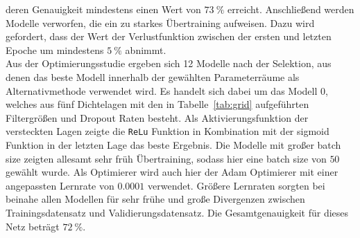 deren Genauigkeit mindestens einen Wert von $\SI{73}{\percent}$ erreicht.
Anschließend werden Modelle verworfen, die ein zu starkes Übertraining
aufweisen. Dazu wird gefordert, dass der Wert der Verlustfunktion zwischen der
ersten und letzten Epoche um mindestens $\SI{5}{\percent}$ abnimmt.\\
Aus der Optimierungsstudie ergeben sich 12 Modelle nach der Selektion, aus
denen das beste Modell innerhalb der gewählten Parameterräume als
Alternativmethode verwendet wird. Es handelt sich dabei um das Modell 0,
welches aus fünf Dichtelagen mit den in Tabelle~\ref{tab:grid} aufgeführten
Filtergrößen und Dropout Raten besteht. Als Aktivierungsfunktion der
versteckten Lagen zeigte die \texttt{ReLu} Funktion in Kombination mit der
sigmoid Funktion in der letzten Lage das beste Ergebnis. Die Modelle mit großer
batch size zeigten allesamt sehr früh Übertraining, sodass hier eine batch size
von $50$ gewählt wurde. Als Optimierer wird auch hier der Adam Optimierer mit
einer angepassten Lernrate von $0.0001$ verwendet. Größere Lernraten sorgten
bei beinahe allen Modellen für sehr frühe und große Divergenzen zwischen
Trainingsdatensatz und Validierungsdatensatz. Die Gesamtgenauigkeit für dieses
Netz beträgt $\SI{72}{\percent}$.
